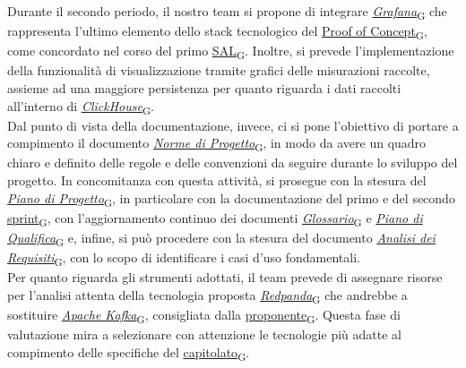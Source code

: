 Durante il secondo periodo, il nostro team si propone di integrare \href{https://7last.github.io/docs/pb/documentazione-interna/glossario\#grafana}{\textit{Grafana}\textsubscript{G}} che rappresenta l'ultimo elemento dello stack tecnologico del \href{https://7last.github.io/docs/pb/documentazione-interna/glossario\#proof-of-concept}{Proof of Concept\textsubscript{G}}, come concordato nel corso del primo \href{https://7last.github.io/docs/pb/documentazione-interna/glossario\#stato-avanzamento-lavori}{SAL\textsubscript{G}}. Inoltre, si prevede l'implementazione della funzionalità di visualizzazione tramite grafici delle misurazioni raccolte,
assieme ad una maggiore persistenza per quanto riguarda i dati raccolti all'interno di \href{https://7last.github.io/docs/pb/documentazione-interna/glossario\#clickhouse}{\textit{ClickHouse}\textsubscript{G}}. \\
Dal punto di vista della documentazione, invece, ci si pone l'obiettivo di portare a compimento il documento \href{https://7last.github.io/docs/pb/documentazione-interna/glossario\#norme-di-progetto}{\textit{Norme di Progetto}\textsubscript{G}}, in modo da avere un quadro chiaro e definito delle regole e delle convenzioni da seguire durante lo sviluppo del progetto. In concomitanza con questa attività, si prosegue con la stesura del \href{https://7last.github.io/docs/pb/documentazione-interna/glossario\#piano-di-progetto}{\textit{Piano di Progetto}\textsubscript{G}}, in particolare con la documentazione del primo e del secondo \href{https://7last.github.io/docs/pb/documentazione-interna/glossario\#sprint}{sprint\textsubscript{G}}, con l'aggiornamento continuo dei documenti \href{https://7last.github.io/docs/pb/documentazione-interna/glossario\#glossario}{\textit{Glossario}\textsubscript{G}} e \href{https://7last.github.io/docs/pb/documentazione-interna/glossario\#piano-di-qualifica}{\textit{Piano di Qualifica}\textsubscript{G}} e, infine, si può procedere con la stesura del documento \href{https://7last.github.io/docs/pb/documentazione-interna/glossario\#analisi-dei-requisiti}{\textit{Analisi dei Requisiti}\textsubscript{G}}, con lo scopo di identificare i casi d'uso fondamentali. \\
Per quanto riguarda gli strumenti adottati, il team prevede di assegnare risorse per l'analisi attenta della tecnologia proposta \href{https://7last.github.io/docs/pb/documentazione-interna/glossario\#redpanda}{\textit{Redpanda}\textsubscript{G}} che andrebbe a sostituire \href{https://7last.github.io/docs/pb/documentazione-interna/glossario\#apache-kafka}{\textit{Apache Kafka}\textsubscript{G}}, consigliata dalla \href{https://7last.github.io/docs/pb/documentazione-interna/glossario\#proponente}{proponente\textsubscript{G}}. Questa fase di valutazione mira a selezionare con attenzione le tecnologie più adatte al compimento delle specifiche del \href{https://7last.github.io/docs/pb/documentazione-interna/glossario\#capitolato}{capitolato\textsubscript{G}}.

